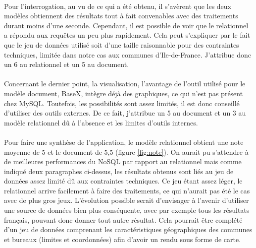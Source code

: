
\paragraph{}Pour l'interrogation, au vu de ce qui a été obtenu, il s'avèrent que les deux modèles obtiennent des résultats tout à fait convenables avec des traitements durant moins d'une seconde. Cependant, il est possible de voir que le relationnel a répondu aux requêtes un peu plus rapidement. Cela peut s'expliquer par le fait que le jeu de données utilisé soit d'une taille raisonnable pour des contraintes techniques, limitée dans notre cas aux communes d'Ile-de-France.  J'attribue donc un 6 au relationnel et un 5 au document.

\paragraph{}Concernant le dernier point, la visualisation, l'avantage de l'outil utilisé pour le modèle document, BaseX, intègre déjà des graphiques, ce qui n'est pas présent chez MySQL. Toutefois, les possibilités sont assez limités, il est donc conseillé d'utiliser des outils externes. De ce fait, j'attribue un 5 au document et un 3 au modèle relationnel dû à l'absence et les limites d'outils internes.

\paragraph{}Pour faire une synthèse de l'application, le modèle relationnel obtient une note moyenne de 5 et le document de 5,5 (figure \ref{fig:note}). On aurait pu s'attendre à de meilleures performances du NoSQL par rapport au relationnel mais comme indiqué deux paragraphes ci-dessus, les résultats obtenus sont liés au jeu de données assez limité dû aux contraintes techniques. Ce jeu étant assez léger, le relationnel arrive facilement à faire des traitements, ce qui n'aurait pas été le cas avec de plus gros jeux. L'évolution possible serait d'envisager à l'avenir d'utiliser une source de données bien plus conséquente, avec par exemple tous les résultats français, pouvant donc donner tout autre résultat. Cela pourrait être complété d'un jeu de données comprenant les caractéristiques géographiques des communes et bureaux (limites et coordonnées) afin d'avoir un rendu sous forme de carte.

